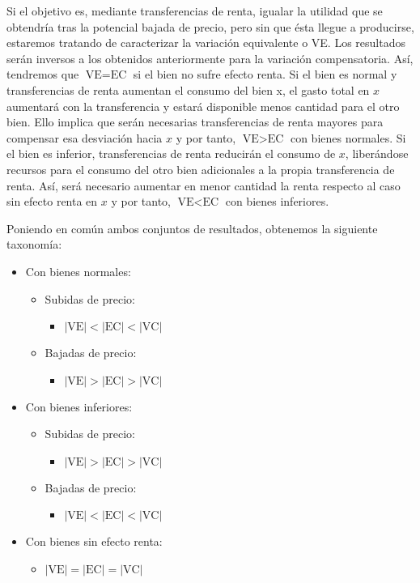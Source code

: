 \documentclass{nuevotema}
\begin{document}
Si el objetivo es, mediante transferencias de renta, igualar la utilidad que se obtendría tras la potencial bajada de precio, pero sin que ésta llegue a producirse, estaremos tratando de caracterizar la variación equivalente o VE. Los resultados serán inversos a los obtenidos anteriormente para la variación compensatoria. Así, tendremos que $\text{VE} = \text{EC}$ si el bien no sufre efecto renta. Si el bien es normal y transferencias de renta aumentan el consumo del bien x, el gasto total en $x$ aumentará con la transferencia y estará disponible menos cantidad para el otro bien. Ello implica que serán necesarias transferencias de renta mayores para compensar esa desviación hacia $x$ y por tanto, $\text{VE} > \text{EC}$ con bienes normales. Si el bien es inferior, transferencias de renta reducirán el consumo de $x$, liberándose recursos para el consumo del otro bien adicionales a la propia transferencia de renta. Así, será necesario aumentar en menor cantidad la renta respecto al caso sin efecto renta en $x$ y por tanto, $\text{VE} < \text{EC}$ con bienes inferiores.

Poniendo en común ambos conjuntos de resultados, obtenemos la siguiente taxonomía:

\begin{itemize}
	\item Con bienes normales:
	\begin{itemize}
		\item Subidas de precio:
		\begin{itemize}
			\item $\left| \text{VE} \right|< \left| \text{EC} \right|< \left| \text{VC} \right| $
		\end{itemize}
		\item Bajadas de precio:
		\begin{itemize}
			\item $\left| \text{VE} \right|> \left| \text{EC} \right|> \left| \text{VC}\right|$
		\end{itemize}
	\end{itemize}
	\item Con bienes inferiores:
	\begin{itemize}
		\item Subidas de precio:
		\begin{itemize}
			\item $\left| \text{VE} \right| >\left| \text{EC} \right|>\left| \text{VC}\right|$
		\end{itemize}
		\item Bajadas de precio:
		\begin{itemize}
			\item  $\left|\text{VE} \right|< \left|\text{EC} \right|< \left|\text{VC}\right|$
		\end{itemize}
	\end{itemize}
	\item Con bienes sin efecto renta:
	\begin{itemize}
		\item $\left| \text{VE} \right| = \left|\text{EC} \right|= \left|\text{VC}\right|$
	\end{itemize}
\end{itemize}
\end{document}
